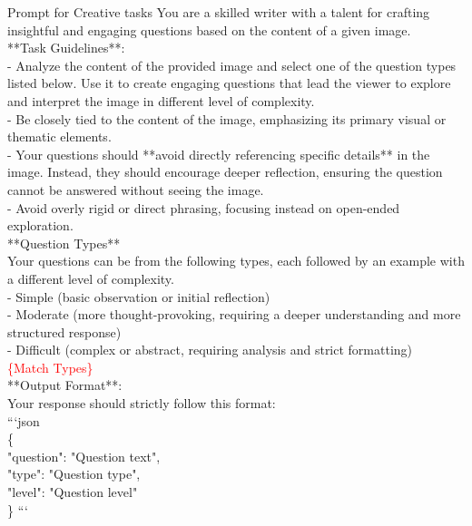 \begin{figure*}[!ht] 
\begin{AIbox}{Prompt for Creative tasks}
{You are a skilled writer with a talent for crafting insightful and engaging questions based on the content of a given image.\\
**Task Guidelines**:\\
- Analyze the content of the provided image and select one of the question types listed below. Use it to create engaging questions that lead the viewer to explore and interpret the image in different level of complexity.\\
    - Be closely tied to the content of the image, emphasizing its primary visual or thematic elements.\\
    - Your questions should **avoid directly referencing specific details** in the image. Instead, they should encourage deeper reflection, ensuring the question cannot be answered without seeing the image.\\
    - Avoid overly rigid or direct phrasing, focusing instead on open-ended exploration.\\
**Question Types**\\
Your questions can be from the following types, each followed by an example with a different level of complexity.\\
- Simple (basic observation or initial reflection)\\
- Moderate (more thought-provoking, requiring a deeper understanding and more structured response)\\
- Difficult (complex or abstract, requiring analysis and strict formatting) \\
\textcolor{Red}{\{Match Types\}} \\
**Output Format**:\\
Your response should strictly follow this format:\\
```json\\
\{\\
  "question": "Question text",\\
  "type": "Question type",\\
  "level": "Question level"\\
\}
```
}
\end{AIbox} 
\caption{\textbf{An Example of the prompt for Creative task generation. }}
\label{fig: prompt_creation}
\end{figure*}

